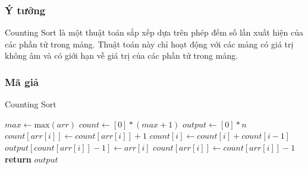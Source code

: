 \subsubsection{Ý tưởng}

Counting Sort là một thuật toán sắp xếp dựa trên phép đếm số lần xuất hiện của các phần tử trong mảng. Thuật toán này chỉ hoạt động với các mảng có giá trị không âm và có giới hạn về giá trị của các phần tử trong mảng.

\subsubsection{Mã giả}

\begin{algorithm}[H]
\caption{Counting Sort}
\begin{algorithmic}[1]
    \State $max \gets \text{max}(arr)$
    \State $count \gets [0] * (max + 1)$
    \State $output \gets [0] * n$
        \State $count[arr[i]] \gets count[arr[i]] + 1$
    \EndFor
        \State $count[i] \gets count[i] + count[i - 1]$
    \EndFor
        \State $output[count[arr[i]] - 1] \gets arr[i]$
        \State $count[arr[i]] \gets count[arr[i]] - 1$
    \EndFor
    \State \textbf{return} $output$
\EndFunction
\end{algorithmic}
\end{algorithm}